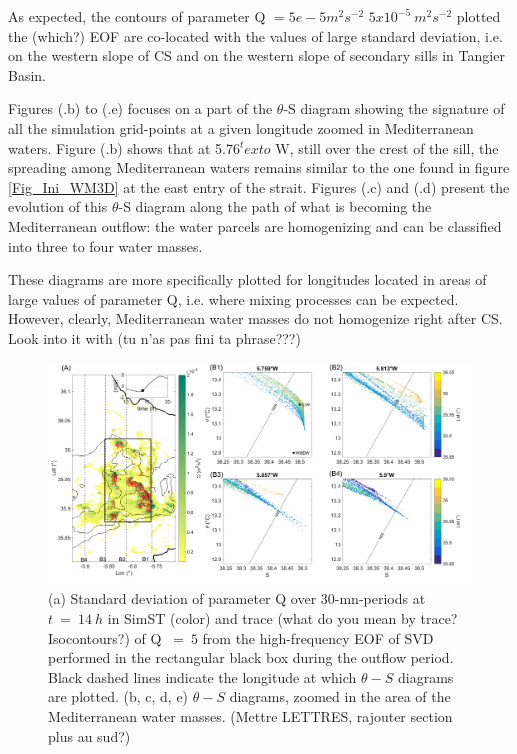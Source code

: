 As expected, the contours of parameter Q  \color{blue}\sout{$=5e-5m^2s^{-2}$} $5x10^{-5}\ m^2s^{-2}$ plotted the \color{green}(which?) \color{blue} EOF are co-located with the values of large standard deviation, i.e. on the western slope of CS and on the western slope of secondary sills in Tangier Basin. \color{black} 

\color{blue}Figures (.b) to (.e) focuses on  \color{blue} a part \color{black} of the $\theta$-S diagram showing the signature of all the simulation grid-points at a given longitude zoomed in Mediterranean waters. Figure (.b) shows that at 5.76$^text{o}$ W, still over the crest of the sill, the spreading among Mediterranean waters remains similar to \color{black} the one found in figure \ref{Fig_Ini_WM3D} at the east entry of the strait. \color{blue}Figures (.c) and (.d) present the evolution of this $\theta$-S diagram along the path of what is becoming the Mediterranean outflow: \color{black} the water parcels are homogenizing and can be classified into three to four water masses.

These diagrams are \color{blue}more specifically \color{black} plotted for longitudes located in areas of large values of parameter Q, i.e. where mixing processes can be expected. However, clearly, Mediterranean water masses do not homogenize right after CS.  \color{green}Look into it with (tu n'as pas fini ta phrase???) \color{black}

\begin{figure}[!h]
 \includegraphics[width=\textwidth]{./GBR3D/TS_coupes_14H_VE2o.png}
 \caption {(a) Standard deviation of parameter Q over 30-mn-periods at $t\ =\ 14\ h$ in SimST (color) and trace \color{green}(what do you mean by trace? Isocontours?) of Q $\ =\ 5$\color{black} from the high-frequency EOF of SVD performed in the rectangular black box during the outflow period. Black dashed lines indicate the longitude at which $\theta-S$ diagrams are plotted. (b, c, d, e) $\theta-S$ diagrams, zoomed in the area of the Mediterranean water masses.  \color{green}(Mettre LETTRES, rajouter section plus au sud?) \color{black}}
 \label{FigTSCS}
\end{figure}

